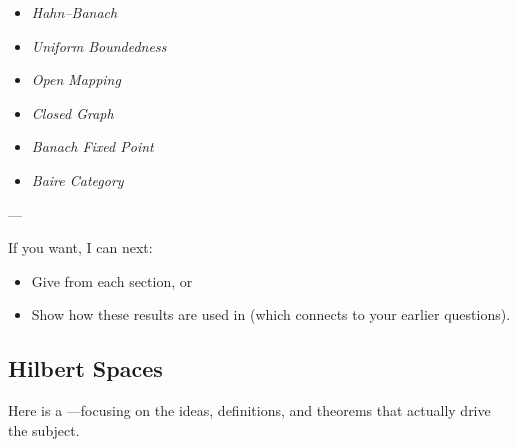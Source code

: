 \documentclass[12pt,a4paper]{report}
\begin{document}
\begin{description}
\begin{itemize}
            \begin{itemize}
            \item \textit{Hahn–Banach}
            \item \textit{Uniform Boundedness}
            \item \textit{Open Mapping}
            \item \textit{Closed Graph}
            \item \textit{Banach Fixed Point}
            \item \textit{Baire Category}
            \end{itemize}
    \end{itemize}

---
\end{description}

If you want, I can next:

            \begin{itemize}
            \item Give  from each section, or
            \item Show how these results are used in  (which connects to your earlier questions).
            \end{itemize}

\newpage
\subsection*{Hilbert Spaces}

Here is a —focusing on the ideas, definitions, and theorems that actually drive the subject.
\end{document}
